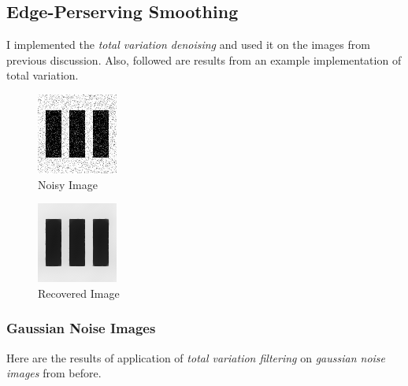 \documentclass{article}
\begin{document}
    
    \pagebreak
    \subsection*{Edge-Perserving Smoothing}
    I implemented the \textit{total variation denoising} and used it on the images from previous discussion. Also, followed are results from an example implementation of total variation.
    
    \begin{figure}[!htb]
    \begin{center}
     \includegraphics[scale=2.4]{./edge_preserving_smoothing/example/tv_noisy.png}
     \caption{Noisy Image}
    \end{center}
    \end{figure}
    
    \begin{figure}[!htb]
    \begin{center}
     \includegraphics[scale=2.4]{./edge_preserving_smoothing/example/tv_recovered.png}
     \caption{Recovered Image}
    \end{center}
    \end{figure}
    
    \pagebreak
    \subsubsection*{Gaussian Noise Images}
    Here are the results of application of \textit{total variation filtering} on \textit{gaussian noise images} from before.
    
\end{document}
